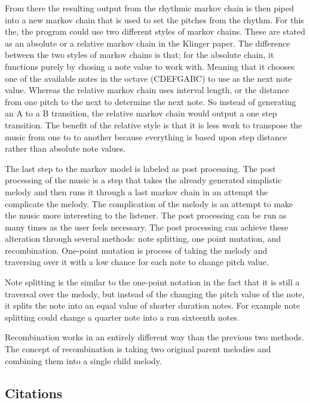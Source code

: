 \documentclass{sig-alternate}
\begin{document}
	From there the resulting output from the rhythmic markov chain is then piped into a new markov chain that is used to set the pitches from the rhythm. For this the, the program could use two different styles of markov chains. These are stated as an absolute or a relative markov chain in the Klinger paper. The difference between the two styles of markov chains is that; for the absolute chain, it functions purely by chosing a note value to work with. Meaning that it chooses one of the available notes in the octave (CDEFGABC) to use as the next note value. Whereas the relative markov chain uses interval length, or the distance from one pitch to the next to determine the next note. So instead of generating an A to a B transition, the relative markov chain would output a one step transition. The benefit of the relative style is that it is less work to transpose the music from one to to another because everything is based upon step distance rather than absolute note values.

	The last step to the markov model is labeled as post processing. The post processing of the music is a step that takes the already generated simplistic melody and then runs it through a last markov chain in an attempt the complicate the melody. The complication of the melody is an attempt to make the music more interesting to the listener. The post processing can be run as many times as the user feels necessary. The post processing can achieve these alteration through several methods: note splitting, one point mutation, and recombination.
	One-point mutation is process of taking the melody and traversing over it with a low chance for each note to change pitch value.
	
	Note splitting is the similar to the one-point notation in the fact that it is still a traversal over the melody, but instead of the changing the pitch value of the note, it splits the note into an equal value of shorter duration notes. For example note splitting could change a quarter note into a run sixteenth notes.

	Recombination works in an entirely different way than the previous two methods. The concept of recombination is taking two original parent melodies and combining them into a single child melody.

	
	

\label{sec:methodsandmusic}
\subsection{Citations}
\label{sec:citations}
\end{document}
